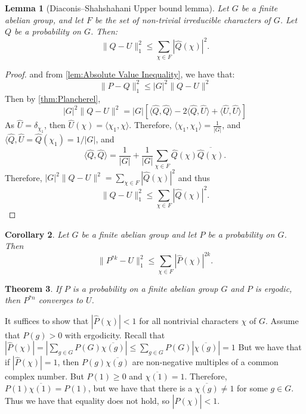 \documentclass[]{article}
\newtheorem{theorem}{Theorem}
\newtheorem{corollary}[theorem]{Corollary}
\newtheorem{lemma}[theorem]{Lemma}
\theoremstyle{definition}
\numberwithin{theorem}{section}
\numberwithin{equation}{section}
\begin{document}
\begin{lemma}[Diaconis–Shahshahani Upper bound lemma]
	\label{lem:Upper bound lemma}
	Let $G$ be a finite abelian group, and let $F$ be the set of non-trivial irreducible characters of $G$. Let $Q$ be a probability on $G$.  Then:
	\begin{equation}
		\|Q - U\|^2_{1} \leq \sum_{\chi \in F} |\widehat{Q}(\chi)|^2.
	\end{equation}
\end{lemma}
\begin{proof}[Proof]

	and from \cref{lem:Absolute Value Inequality}, we have that:
	\begin{equation}
		 \| P - Q\|_1^2 \leq |G|^2 \| Q - U \|^2
	\end{equation}
	Then by \cref{thm:Plancherel},
	\begin{equation}
		|G|^2 \|Q - U \|^2 = |G| \left[ \langle \widehat{Q}, \widehat{Q} \rangle - 2 \langle \widehat{Q}, \widehat{U} \rangle + \langle \widehat{U}, \widehat{U} \rangle \right]
	\end{equation}
	As $\widehat{U} = \delta_{\chi_1}$, then $\widehat{U}(\chi) = \langle \chi_1, \chi \rangle$. 
	Therefore, $\langle \chi_1, \chi_1 \rangle = \frac{1}{|G|}$, and $\langle \widehat{Q}, \widehat{U} = \widehat{Q}(\chi_1) = 1/|G|$, and
	\begin{equation}
		\langle \widehat{Q}, \widehat{Q} \rangle =\frac{1}{|G|} + \frac{1}{|G|} \sum_{\chi \in F} \widehat{Q}(\chi) \overline{\widehat{Q}(\chi)}.
	\end{equation}
	Therefore, $|G|^2 \|Q - U \|^2 =  \sum_{\chi \in F}| \widehat{Q}(\chi)|^2$ and thus 
	\begin{equation}
		\|Q - U\|^2_{1} \leq \sum_{\chi \in F} |\widehat{Q}(\chi)|^2.
	\end{equation}
\end{proof}

\begin{corollary}
	\label{cor:Convolution Inequality}
	Let $G$ be a finite abelian group and let $P$ be a probability on $G$. Then 
	\begin{equation}
	\|P^{\ast k} - U\|^2_{1} \leq \sum_{\chi \in F} |\widehat{P}(\chi)|^{2k}.
\end{equation}
\end{corollary}

\begin{theorem}
	If $P$ is a probability on a finite abelian group $G$ and $P$ is ergodic, then $P^{\ast n}$ converges to $U$.
\end{theorem}
It suffices to show that $|\widehat{P}(\chi)| < 1$ for all nontrivial characters $\chi$ of $G$. Assume that $P(g) > 0$ with ergodicity. Recall that $|\widehat{P}(\chi)| = |\sum_{g \in G} P(G) \overline{\chi(g)}| \leq \sum_{g \in G} P(G) |\overline{\chi(g)}| = 1$ But we have that if $|\widehat{P}(\chi)| = 1$, then $P(g) \overline{\chi(g)}$ are non-negative multiples of a common complex number. But $P(1) \geq 0$ and $\overline{\chi(1)} = 1$. Therefore, $P(1) \overline{\chi(1)} = P(1)$, but we have that there is a $\overline{\chi(g)} \neq 1$ for some $g \in G$. Thus we have that equality does not hold, so $|\widehat{P}(\chi)| < 1$. 
\end{document}
